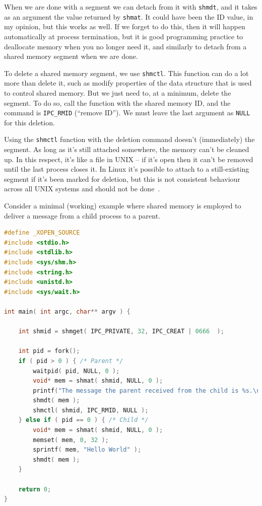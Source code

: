 When we are done with a segment we can detach from it with \texttt{shmdt}, and it takes as an argument the value returned by \texttt{shmat}. It could have been the ID value, in my opinion, but this works as well. If we forget to do this, then it will happen automatically at process termination, but it is good programming practice to deallocate memory when you no longer need it, and similarly to detach from a shared memory segment when we are done.

To delete a shared memory segment, we use \texttt{shmctl}. This function can do a lot more than delete it, such as modify properties of the data structure that is used to control shared memory. But we just need to, at a minimum, delete the segment. To do so, call the function with the shared memory ID, and the command is \texttt{IPC\_RMID} (``remove ID''). We must leave the last argument as \texttt{NULL} for this deletion.

Using the \texttt{shmctl} function with the deletion command doesn't (immediately) the segment. As long as it's still attached somewhere, the memory can't be cleaned up. In this respect, it's like a file in UNIX -- if it's open then it can't be removed until the last process closes it. In Linux it's possible to attach to a still-existing segment if it's been marked for deletion, but this is not consistent behaviour across all UNIX systems and should not be done~\cite{lpi}.


Consider a minimal (working) example where shared memory is employed to deliver a message from a child process to a parent.
\begin{lstlisting}[language=C]
#define _XOPEN_SOURCE
#include <stdio.h>
#include <stdlib.h>
#include <sys/shm.h>
#include <string.h>
#include <unistd.h>
#include <sys/wait.h>

int main( int argc, char** argv ) { 

    int shmid = shmget( IPC_PRIVATE, 32, IPC_CREAT | 0666  );  

    int pid = fork();
    if ( pid > 0 ) { /* Parent */
        waitpid( pid, NULL, 0 );
        void* mem = shmat( shmid, NULL, 0 );
        printf("The message the parent received from the child is %s.\n", (char*) mem );
        shmdt( mem );
        shmctl( shmid, IPC_RMID, NULL );
    } else if ( pid == 0 ) { /* Child */
        void* mem = shmat( shmid, NULL, 0 );
        memset( mem, 0, 32 );
        sprintf( mem, "Hello World" );
        shmdt( mem );
    }   

    return 0;
}
\end{lstlisting}

